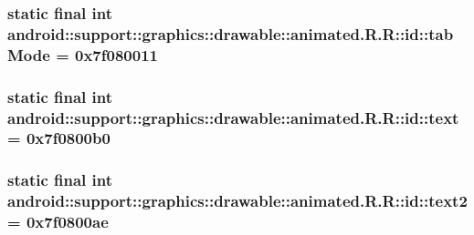 \hypertarget{classandroid_1_1support_1_1graphics_1_1drawable_1_1animated_1_1_r_1_1id_d48b4e10fb472ff83a1a0a745e47add2}{
\subsubsection[{tabMode}]{\setlength{\rightskip}{0pt plus 5cm}static final int android::support::graphics::drawable::animated.R.R::id::tabMode = 0x7f080011}}
\label{classandroid_1_1support_1_1graphics_1_1drawable_1_1animated_1_1_r_1_1id_d48b4e10fb472ff83a1a0a745e47add2}


\hypertarget{classandroid_1_1support_1_1graphics_1_1drawable_1_1animated_1_1_r_1_1id_9ec962799ed7ae73587b3d0370127b70}{
\subsubsection[{text}]{\setlength{\rightskip}{0pt plus 5cm}static final int android::support::graphics::drawable::animated.R.R::id::text = 0x7f0800b0}}
\label{classandroid_1_1support_1_1graphics_1_1drawable_1_1animated_1_1_r_1_1id_9ec962799ed7ae73587b3d0370127b70}


\hypertarget{classandroid_1_1support_1_1graphics_1_1drawable_1_1animated_1_1_r_1_1id_546f410f7b4fb51dddc6764451a09c34}{
\subsubsection[{text2}]{\setlength{\rightskip}{0pt plus 5cm}static final int android::support::graphics::drawable::animated.R.R::id::text2 = 0x7f0800ae}}
\label{classandroid_1_1support_1_1graphics_1_1drawable_1_1animated_1_1_r_1_1id_546f410f7b4fb51dddc6764451a09c34}


